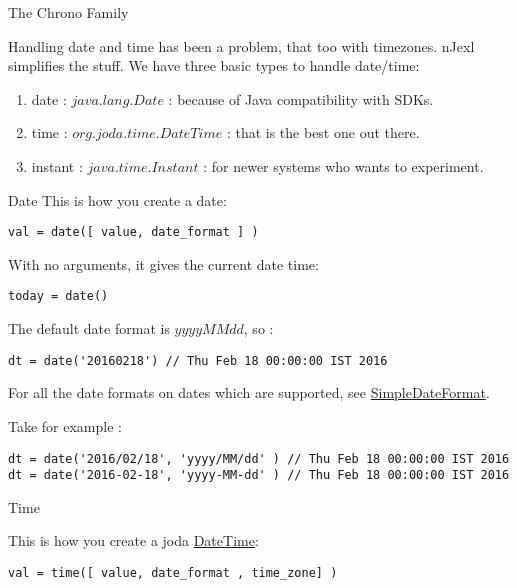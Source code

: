 \begin{section}{The Chrono Family}

Handling date and time has been a problem, that too with timezones.
nJexl simplifies the stuff. 
We have three basic types to handle date/time:
\begin{enumerate}
\item{date : $java.lang.Date$ : because of Java compatibility with SDKs. }
\item{time : $org.joda.time.DateTime$ : that is the best one out there. }
\item{instant : $java.time.Instant$ : for newer systems who wants to experiment. }
\end{enumerate}


\begin{subsection}{Date}
This is how you create a date:
\begin{lstlisting}[style=JexlStyle]
val = date([ value, date_format ] )
\end{lstlisting}

With no arguments, it gives the current date time:

\begin{lstlisting}[style=JexlStyle]
today = date()
\end{lstlisting}

The default date format is $yyyyMMdd$, so :
\begin{lstlisting}[style=JexlStyle]
dt = date('20160218') // Thu Feb 18 00:00:00 IST 2016
\end{lstlisting}

For all the date formats on dates which are supported, 
see \href{https://docs.oracle.com/javase/8/docs/api/java/text/SimpleDateFormat.html}{SimpleDateFormat}.

Take for example :

\begin{lstlisting}[style=JexlStyle]
dt = date('2016/02/18', 'yyyy/MM/dd' ) // Thu Feb 18 00:00:00 IST 2016
dt = date('2016-02-18', 'yyyy-MM-dd' ) // Thu Feb 18 00:00:00 IST 2016
\end{lstlisting}


\end{subsection}

\begin{subsection}{Time}

This is how you create a joda \href{http://joda-time.sourceforge.net/apidocs/org/joda/time/DateTime.html}{DateTime}:
\begin{lstlisting}[style=JexlStyle]
val = time([ value, date_format , time_zone] )
\end{lstlisting}


\end{subsection}
\end{section}
